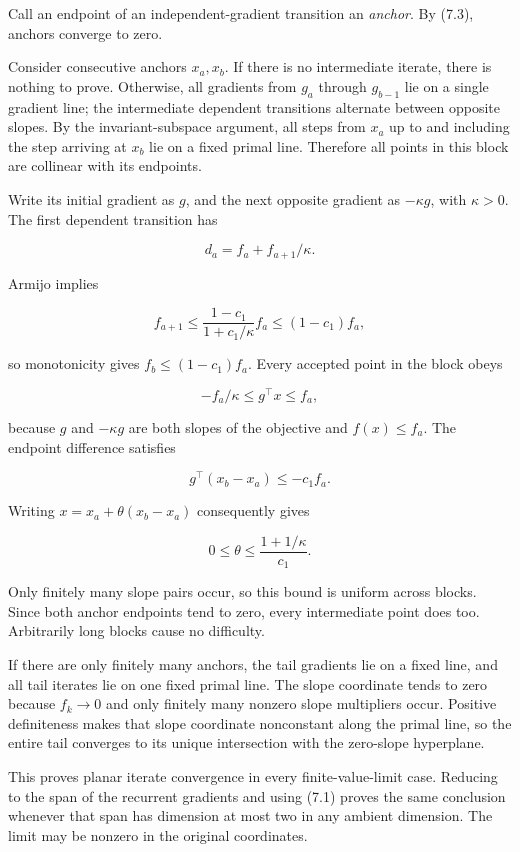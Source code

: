 Call an endpoint of an independent-gradient transition an \emph{anchor}.
By (7.3), anchors converge to zero.

Consider consecutive anchors \(x_a,x_b\). If there is no intermediate
iterate, there is nothing to prove. Otherwise, all gradients from
\(g_a\) through \(g_{b-1}\) lie on a single gradient line; the
intermediate dependent transitions alternate between opposite slopes. By
the invariant-subspace argument, all steps from \(x_a\) up to and
including the step arriving at \(x_b\) lie on a fixed primal line.
Therefore all points in this block are collinear with its endpoints.

Write its initial gradient as \(g\), and the next opposite gradient as
\(-\kappa g\), with \(\kappa>0\). The first dependent transition has

\[
d_a=f_a+f_{a+1}/\kappa.
\]

Armijo implies

\[
f_{a+1}\le\frac{1-c_1}{1+c_1/\kappa}f_a
\le(1-c_1)f_a,
\]

so monotonicity gives \(f_b\le(1-c_1)f_a\). Every accepted point in the
block obeys

\[
-f_a/\kappa\le g^\top x\le f_a,
\]

because \(g\) and \(-\kappa g\) are both slopes of the objective and
\(f(x)\le f_a\). The endpoint difference satisfies

\[
g^\top(x_b-x_a)\le-c_1 f_a.
\]

Writing \(x=x_a+\theta(x_b-x_a)\) consequently gives

\[
0\le\theta\le\frac{1+1/\kappa}{c_1}.
\]

Only finitely many slope pairs occur, so this bound is uniform across
blocks. Since both anchor endpoints tend to zero, every intermediate
point does too. Arbitrarily long blocks cause no difficulty.

If there are only finitely many anchors, the tail gradients lie on a
fixed line, and all tail iterates lie on one fixed primal line. The
slope coordinate tends to zero because \(f_k\to0\) and only finitely
many nonzero slope multipliers occur. Positive definiteness makes that
slope coordinate nonconstant along the primal line, so the entire tail
converges to its unique intersection with the zero-slope hyperplane.

This proves planar iterate convergence in every finite-value-limit case.
Reducing to the span of the recurrent gradients and using (7.1) proves
the same conclusion whenever that span has dimension at most two in any
ambient dimension. The limit may be nonzero in the original coordinates.



